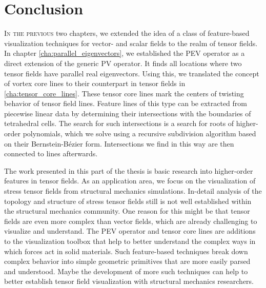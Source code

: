 \chapter{Conclusion} %
\label{cha:tensor_vis_conclusions}
%
\lettrine[lhang=0.06, loversize=-0.015, findent=-1pt]{I}{n the previous} two
chapters, we extended the idea of a class of feature-based visualization
techniques for vector- and scalar fields to the realm of tensor fields.
%
In chapter \cref{cha:parallel_eigenvectors}, we established the \ac{PEV}
operator as a direct extension of the generic \ac{PV} operator.
%
It finds all locations where two tensor fields have parallel real eigenvectors.
%
Using this, we translated the concept of vortex core lines to their counterpart
in tensor fields in \cref{cha:tensor_core_lines}.
%
These tensor core lines mark the centers of twisting behavior of tensor field
lines.
%
Feature lines of this type can be extracted from piecewise linear data by
determining their intersections with the boundaries of tetrahedral cells.
%
The search for such intersections is a search for roots of higher-order
polynomials, which we solve using a recursive subdivision algorithm based on
their Bernstein-B\'ezier form.
%
Intersections we find in this way are then connected to lines afterwards.
%

%
The work presented in this part of the thesis is basic research into
higher-order features in tensor fields.
%
As an application area, we focus on the visualization of stress tensor fields
from structural mechanics simulations.
%
In-detail analysis of the topology and structure of stress tensor fields still
is not well established within the structural mechanics community.
%
One reason for this might be that tensor fields are even more complex than
vector fields, which are already challenging to visualize and understand.
%
The \ac{PEV} operator and tensor core lines are additions to the visualization
toolbox that help to better understand the complex ways in which forces act in
solid materials.
%
Such feature-based techniques break down complex behavior into simple geometric
primitives that are more easily parsed and understood.
%
Maybe the development of more such techniques can help to better establish
tensor field visualization with structural mechanics researchers.
%
